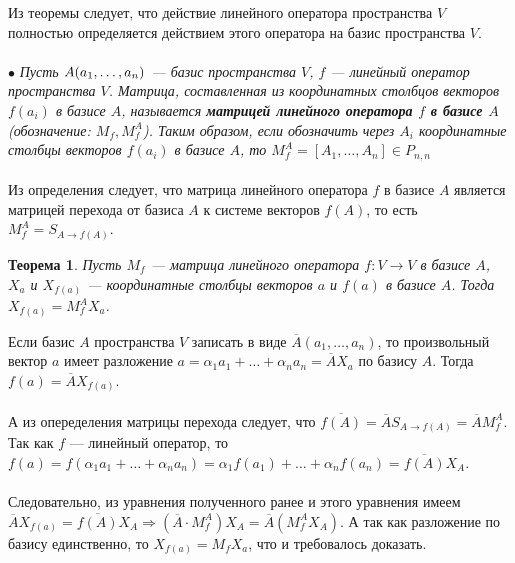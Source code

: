 Из теоремы следует, что действие линейного оператора пространства $V$ полностью определяется действием этого оператора на базис пространства $V$.\\\\
$\bullet$ \textit{Пусть $A(a_1,\dots,a_n)$ --- базис пространства $V$, $f$ --- линейный оператор пространства $V$. Матрица, составленная из координатных столбцов векторов $f(a_i)$ в базисе $A$, называется \textbf{матрицей линейного оператора $f$ в базисе $A$} (обозначение: $M_f, M_f^A$). Таким образом, если обозначить через $A_i$ координатные столбцы векторов $f(a_i)$ в базисе $A$, то $M_f^A = [A_1,\dots,A_n]\in P_{n,n}$}\\\\
Из определения следует, что матрица линейного оператора $f$ в базисе $A$ является матрицей перехода от базиса $A$ к системе векторов $f(A)$, то есть $M_f^A = S_{A\rightarrow f(A)}$. 
\newtheorem*{th11_2_2}{Теорема}\begin{th11_2_2}Пусть $M_f$ --- матрица линейного оператора $f:V\rightarrow V$ в базисе $A$, $X_a$ и $X_{f(a)}$ --- координатные столбцы векторов $a$ и $f(a)$ в базисе $A$. Тогда $X_{f(a)} = M_f^A X_a$.
\end{th11_2_2}\begin{Proof}
	Если базис $A$ пространства $V$ записать в виде $\overline{A}(a_1,\dots, a_n)$, то произвольный вектор $a$ имеет разложение $a = \alpha_1 a_1 +\ldots + \alpha_n a_n = \overline{A}X_a$ по базису $A$. Тогда
	$f(a)= \overline{A}X_{f(a)}$.\\\\ А из опеределения матрицы перехода следует, что $\overline{f(A)} = \overline{A}S_{A\rightarrow f(A)} = \overline{A}M^A_f$. Так как $f$ --- линейный оператор, то $f(a) = f(\alpha_1 a_1 + \ldots + \alpha_n a_n) = \alpha_1 f(a_1) + \ldots + \alpha_n f(a_n) = \overline{f(A)}X_A$.\\\\ Следовательно, из уравнения полученного ранее и этого уравнения имеем
	$\overline{A}X_{f(a)} = \overline{f(A)}X_A\Rightarrow (\overline{A}\cdot M^A_f) X_A = \overline{A}(M^A_f X_A)$. А так как разложение по базису единственно, то $X_{f(a)} = M_f X_a$, что и требовалось доказать.\end{Proof}















